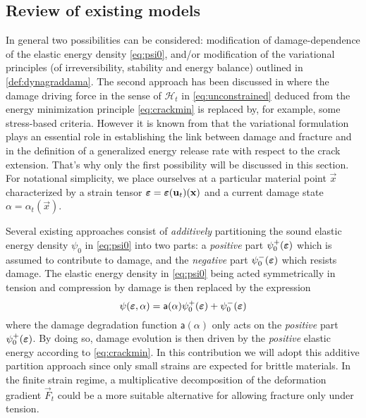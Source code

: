 \subsection{Review of existing models} \label{sec:reviewTC}
In general two possibilities can be considered: modification of damage-dependence of the elastic energy density \eqref{eq:psi0}, and/or modification of the variational principles (of irreversibility, stability and energy balance) outlined in \cref{def:dynagraddama}. The second approach has been discussed in \cite{LorentzKazymyrenko:2014,MieheSchaenzelUlmer:2015} where the damage driving force in the sense of $\mathcal{H}_t$ in \eqref{eq:unconstrained} deduced from the energy minimization principle \eqref{eq:crackmin} is replaced by, for example, some stress-based criteria. However it is known from \cite{SicsicMarigo:2013} that the variational formulation plays an essential role in establishing the link between damage and fracture and in the definition of a generalized energy release rate with respect to the crack extension. That's why only the first possibility will be discussed in this section. For notational simplicity, we place ourselves at a particular material point $\vec{x}$ characterized by a strain tensor $\eps=\eps(\vec{u}_t)(\vec{x})$ and a current damage state $\alpha=\alpha_t(\vec{x})$.

Several existing approaches consist of \emph{additively} partitioning the sound elastic energy density $\psi_0$ in \eqref{eq:psi0} into two parts: a \emph{positive} part $\psi_0^+(\eps)$ which is assumed to contribute to damage, and the \emph{negative} part $\psi_0^-(\eps)$ which resists damage. The elastic energy density in \eqref{eq:psi0} being acted symmetrically in tension and compression by damage is then replaced by the expression
\begin{equation} \label{eq:elasticTC}
\psi(\eps,\alpha)=\mathsf{a}(\alpha)\psi_0^+(\eps)+\psi_0^-(\eps)
\end{equation}
where the damage degradation function $\mathsf{a}(\alpha)$ only acts on the \emph{positive} part $\psi_0^+(\eps)$. By doing so, damage evolution is then driven by the \emph{positive} elastic energy according to \eqref{eq:crackmin}. In this contribution we will adopt this additive partition approach since only small strains are expected for brittle materials. In the finite strain regime, a multiplicative decomposition of the deformation gradient $\vec{F}_t$ could be a more suitable alternative \cite{HeschWeinberg:2014} for allowing fracture only under tension.

